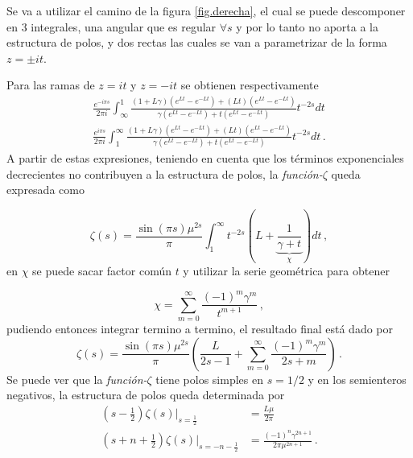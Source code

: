 Se va a utilizar el camino de la figura \ref{fig.derecha}, el cual se puede descomponer en 3 integrales, una angular que es regular $ \forall s$ y por lo tanto no aporta a la estructura de polos, y dos rectas las cuales se van a parametrizar de la forma $z = \pm i  t$. 

Para las ramas de $z= i t$ y $z=- i t$ se obtienen respectivamente
\begin{equation}\label{eq.tirados}
\begin{aligned}
\frac{e ^{-i \pi s}}{2 \pi i} \int _{\infty} ^{1} 
	\frac{(1+L \gamma) \left( e^{L t} - e ^{- L t} \right) +
			(L t) \left( e ^{L t} - e^{- L t} \right)
			}
			{\gamma \left( e ^{L t} - e ^{- L t} \right) + 
			t \left( e ^{L t} - e ^{-L t} \right)}
			t ^{-2s} dt \\[7pt]
\frac{e ^{i \pi s}}{2 \pi i} \int _{1} ^{\infty} 
	\frac{(1+L \gamma) \left( e^{L t} - e ^{- L t} \right) +
			(L t) \left( e ^{L t} - e^{- L t} \right)
			}
			{\gamma \left( e ^{L t} - e ^{- L t} \right) + 
			t \left( e ^{L t} - e ^{-L t} \right)}
			t ^{-2s} dt
			\, .
\end{aligned}
\end{equation}
A partir de estas expresiones, teniendo en cuenta que los términos exponenciales decrecientes no contribuyen a la estructura de polos, la {\it función-$\zeta$} queda expresada como

\begin{equation}
	\zeta  (s) = 
    \frac{ \sin (\pi s) \mu ^{2s}}{ \pi } 
    \int _1 ^{\infty} 
    t^{-2s}
    \left(
    	L + 
	    \underbrace
    	{
		\frac{1}{\gamma + t}   
		} _{\chi} 
	\right)
    dt  \,  ,
\label{contorno}
\end{equation}
en $\chi$ se puede sacar factor común $t$ y utilizar la serie geométrica para obtener

\begin{equation}
    \chi =   \sum _{m=0} ^{\infty} \frac{(-1) ^{m} \gamma ^{m} }{t ^{m+1}}
    \, ,
\label{eq:chi}
\end{equation}
pudiendo entonces integrar termino a termino, el resultado final está dado por
\begin{equation}\label{eq.seta}
    \zeta  (s) = 
    \frac{ \sin(\pi s) \mu ^{2s }}{\pi } 
    \left(
    \frac{L}{2s-1} + 
    \sum _{m=0} ^{\infty}
    \frac{(-1) ^{m} \gamma ^{m} }{2s+m}
    \right) \, .
\end{equation}
Se puede ver que la {\it función-$\zeta$} tiene polos simples en $s=1/2$ y en los semienteros negativos, la estructura de polos queda determinada por
\begin{equation}
\begin{aligned}
\left(s-\frac{1}{2} \right) \zeta(s) |_{s=\frac{1}{2}} &= \frac{L \mu }{2 \pi}   \\
\left( s + n + \frac{1}{2} \right)
\zeta (s ) |_{s= -n - \frac{1}{2}}  &= \frac{ (-1) ^n \gamma ^{2n+1}  }{2 \pi \mu ^{2n + 1}} 
\, .
\end{aligned}
\label{eq.polos.complejo}
\end{equation}


